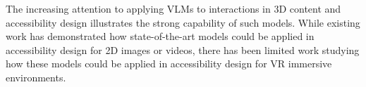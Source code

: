 The increasing attention to applying VLMs to interactions in 3D content and accessibility design illustrates the strong capability of such models. While existing work has demonstrated how state-of-the-art models could be applied %
in accessibility design for 2D images or videos, there has been limited work studying how these models could be applied in accessibility design for VR immersive environments. %

%